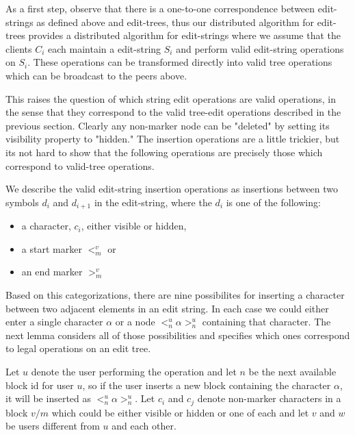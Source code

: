\documentclass{amsart}
\begin{document}
As a first step, observe that there is a one-to-one correspondence between
edit-strings as defined above and edit-trees, thus our distributed algorithm
for edit-trees provides a distributed algorithm for edit-strings where we
assume that the clients $C_i$ each maintain a edit-string $S_i$ and perform valid
edit-string operations on $S_i$. These operations can be transformed directly
into valid tree operations which can be broadcast to the peers above. 

This raises the question of which string edit operations are valid operations,
in the sense that they correspond to the valid tree-edit operations described
in the previous section.  Clearly any non-marker node can be "deleted" by setting
its visibility property to "hidden."  The insertion operations are a little
trickier, but its not hard to show that the following operations are precisely
those which correspond to valid-tree operations. 

We describe the valid edit-string insertion operations as insertions
between two symbols $d_i$ and $d_{i+1}$ in the edit-string, where the $d_i$
is one of the following:
\begin{itemize}
\item  a character, $c_i$, either visible or hidden,
\item  a start marker $<^v_m$ or
\item an end marker $>^v_m$
\end{itemize}
Based on this categorizations, there are nine possibilites for inserting a character between two adjacent elements in an edit string. In each case we could either enter a single character $\alpha$ or a node $<^u_n \alpha >^u_n$ containing that character. The next lemma considers all of those possibilities and specifies which ones correspond to legal operations on an edit tree.

Let $u$ denote the user performing
the operation and let $n$ be the next available block id for user $u$, so if
the user inserts a new block containing the character $\alpha$, it will be inserted
as $<^u_n \alpha >^u_n$.  Let $c_i$ and $c_j$ denote non-marker characters in
a block $v/m$ 
which could be either visible or hidden or one of each and let
 $v$ and $w$ be users different from $u$ and each other.
\end{document}
